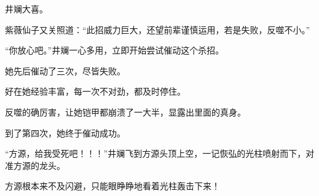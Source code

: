\begin{this_body}
井斓大喜。

紫薇仙子又关照道：“此招威力巨大，还望前辈谨慎运用，若是失败，反噬不小。”

“你放心吧。”井斓一心多用，立即开始尝试催动这个杀招。

她先后催动了三次，尽皆失败。

好在她经验丰富，每一次不对劲，都及时停住。

反噬的确厉害，让她铠甲都崩溃了一大半，显露出里面的真身。

到了第四次，她终于催动成功。

“方源，给我受死吧！！！”井斓飞到方源头顶上空，一记恢弘的光柱喷射而下，对准方源的龙头。

方源根本来不及闪避，只能眼睁睁地看着光柱轰击下来！

\end{this_body}

